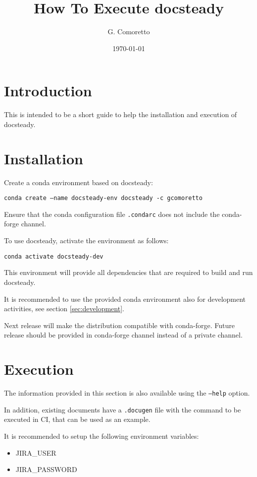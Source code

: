 \documentclass[DM]{lsstdoc}
\author{G. Comoretto}
\begin{document}
\date{\today}

\title{How To Execute docsteady}
\mkshorttitle

\section{Introduction}

This is intended to be a short guide to help the installation and  execution of docsteady.


\section{Installation}\label{sec:install}

Create a conda environment based on docsteady:

\texttt{conda create --name docsteady-env docsteady -c gcomoretto}

Ensure that the conda configuration file  \texttt{.condarc} does not include the conda-forge channel.

To use docsteady, activate the environment as follows:

\texttt{conda activate docsteady-dev}

This environment will provide all dependencies that are required to build and run docsteady.

It is recommended to use the provided conda environment also for development activities, see section \ref{sec:development}.

Next release will make the distribution compatible with conda-forge. Future release should be provided in conda-forge channel instead of a private channel.


\section{Execution}

The information provided in this section is also available using the \texttt{--help} option.

In addition, existing documents have a \texttt{.docugen} file with the command to be executed in CI, that can be used as an example.

It is recommended to setup the following environment variables:

\begin{itemize}
\item JIRA\_USER
\item JIRA\_PASSWORD
\end{itemize}
\end{document}
